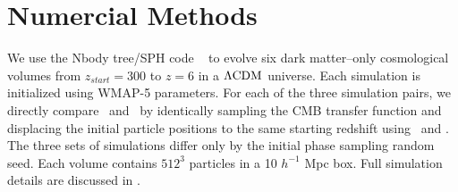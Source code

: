 
%
%

\section{Numercial Methods}
\label{sec:methods}






We use the Nbody tree/SPH code \gadgettwo\ \citep{2001NewA....6...79S, 2005MNRAS.364.1105S} to evolve six dark matter--only cosmological volumes from $z_{start} = 300$ to $z = 6$ in a $\rm \Lambda CDM$ universe.  Each simulation is initialized using WMAP-5 \citep{2009ApJS..180..330K} parameters.  For each of the three simulation pairs, we directly compare \lpt\ and \za\ by identically sampling the CMB transfer function and displacing the initial particle positions to the same starting redshift using \lpt\ and \za.  The three sets of simulations differ only by the initial phase sampling random seed.  Each volume contains $512^{3}$ particles in a 10 $h^{-1}$ Mpc box.  Full simulation details are discussed in \citet{2012ApJ...761L...8H}.

